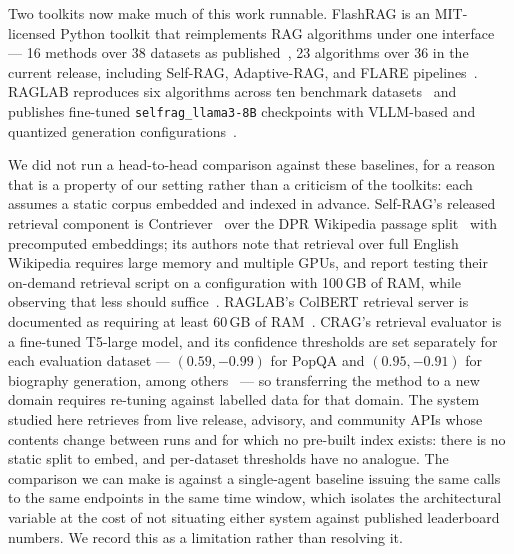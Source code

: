 \documentclass[acmsmall,review,anonymous,screen]{acmart}
\begin{document}
Two toolkits now make much of this work runnable. FlashRAG is an MIT-licensed
Python toolkit that reimplements RAG algorithms under one interface --- 16
methods over 38 datasets as published~\cite{jin2025flashrag}, 23 algorithms over
36 in the current release, including Self-RAG, Adaptive-RAG, and FLARE
pipelines~\cite{flashrag2025repo}. RAGLAB reproduces six algorithms across ten
benchmark datasets~\cite{zhang2024raglab} and publishes fine-tuned
\texttt{selfrag\_llama3-8B} checkpoints with VLLM-based and quantized generation
configurations~\cite{raglab2024repo}.

We did not run a head-to-head comparison against these baselines, for a reason
that is a property of our setting rather than a criticism of the toolkits: each
assumes a static corpus embedded and indexed in advance. Self-RAG's released
retrieval component is Contriever~\cite{izacard2022contriever} over the DPR
Wikipedia passage split~\cite{karpukhin2020dpr} with precomputed embeddings; its
authors note that retrieval over full English Wikipedia requires large memory
and multiple GPUs, and report testing their on-demand retrieval script on a
configuration with 100\,GB of RAM, while observing that less should
suffice~\cite{selfrag2023repo}. RAGLAB's ColBERT retrieval server is documented
as requiring at least 60\,GB of RAM~\cite{raglab2024repo}. CRAG's retrieval
evaluator is a fine-tuned T5-large model, and its confidence thresholds are set
separately for each evaluation dataset --- $(0.59, -0.99)$ for PopQA and
$(0.95, -0.91)$ for biography generation, among others~\cite{yan2024crag} --- so
transferring the method to a new domain requires re-tuning against labelled data
for that domain. The system studied here retrieves from live release, advisory,
and community APIs whose contents change between runs and for which no pre-built
index exists: there is no static split to embed, and per-dataset thresholds have
no analogue. The comparison we can make is against a single-agent baseline
issuing the same calls to the same endpoints in the same time window, which
isolates the architectural variable at the cost of not situating either system
against published leaderboard numbers. We record this as a limitation rather than
resolving it.
\end{document}
